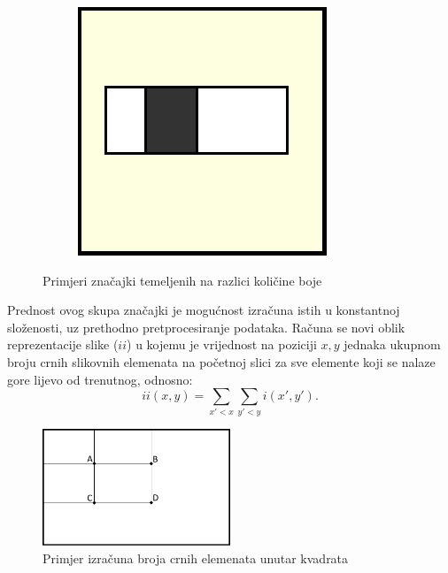 \documentclass[times, utf8, zavrsni, numeric]{fer}
\begin{document}
\begin{figure}[th!]
\begin{subfigure}{.25\textwidth}
        \captionsetup{justification=centering}
        \caption{}
        \label{fig:haar3}
    \end{subfigure}%
    \begin{subfigure}{.25\textwidth}
        \centering
        \includegraphics[width=.5\linewidth]{Images/Haar_HT.pdf}
        \captionsetup{justification=centering}
        \caption{}
        \label{fig:haar4}
    \end{subfigure}
    \caption{Primjeri značajki temeljenih na razlici količine boje}
    \label{fig:haarFeatures}
\end{figure}

Prednost ovog skupa značajki je mogućnost izračuna istih u konstantnoj složenosti, uz prethodno pretprocesiranje podataka.
Računa se novi oblik reprezentacije slike ($ii$) u kojemu je vrijednost na poziciji $x, y$ jednaka ukupnom broju crnih slikovnih elemenata na početnoj slici za sve elemente koji se nalaze gore lijevo od trenutnog, odnosno:
\[
    ii(x, y) = 
        \displaystyle \sum_{x' < x} 
        \displaystyle \sum_{y' < y}
        i(x', y').
\]

\begin{figure}[ht!]
    \centering
    \includegraphics[width=0.5\textwidth]{Images/Integral.pdf}
    \captionsetup{justification=centering}
    \caption{Primjer izračuna broja crnih elemenata unutar kvadrata}
    \label{fig:integral}
\end{figure}
\end{document}
